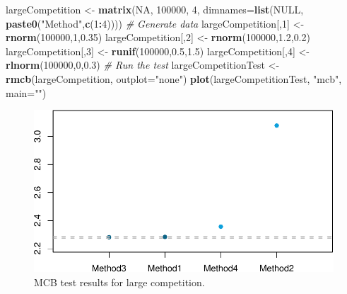 \documentclass[]{book}
\newenvironment{Shaded}{\begin{snugshade}}{\end{snugshade}}
\newcommand{\CommentTok}[1]{\textcolor[rgb]{0.56,0.35,0.01}{\textit{#1}}}
\newcommand{\DataTypeTok}[1]{\textcolor[rgb]{0.13,0.29,0.53}{#1}}
\newcommand{\DecValTok}[1]{\textcolor[rgb]{0.00,0.00,0.81}{#1}}
\newcommand{\FloatTok}[1]{\textcolor[rgb]{0.00,0.00,0.81}{#1}}
\newcommand{\KeywordTok}[1]{\textcolor[rgb]{0.13,0.29,0.53}{\textbf{#1}}}
\newcommand{\NormalTok}[1]{#1}
\newcommand{\OperatorTok}[1]{\textcolor[rgb]{0.81,0.36,0.00}{\textbf{#1}}}
\newcommand{\OtherTok}[1]{\textcolor[rgb]{0.56,0.35,0.01}{#1}}
\newcommand{\StringTok}[1]{\textcolor[rgb]{0.31,0.60,0.02}{#1}}
\theoremstyle{definition}
\theoremstyle{definition}
\theoremstyle{definition}
\theoremstyle{definition}
\theoremstyle{remark}
\begin{document}
\begin{Shaded}
\begin{Highlighting}[]
\NormalTok{largeCompetition <-}\StringTok{ }
\StringTok{  }\KeywordTok{matrix}\NormalTok{(}\OtherTok{NA}\NormalTok{, }\DecValTok{100000}\NormalTok{, }\DecValTok{4}\NormalTok{,}
         \DataTypeTok{dimnames=}\KeywordTok{list}\NormalTok{(}\OtherTok{NULL}\NormalTok{, }\KeywordTok{paste0}\NormalTok{(}\StringTok{"Method"}\NormalTok{,}\KeywordTok{c}\NormalTok{(}\DecValTok{1}\OperatorTok{:}\DecValTok{4}\NormalTok{))))}
\CommentTok{# Generate data}
\NormalTok{largeCompetition[,}\DecValTok{1}\NormalTok{] <-}\StringTok{ }\KeywordTok{rnorm}\NormalTok{(}\DecValTok{100000}\NormalTok{,}\DecValTok{1}\NormalTok{,}\FloatTok{0.35}\NormalTok{)}
\NormalTok{largeCompetition[,}\DecValTok{2}\NormalTok{] <-}\StringTok{ }\KeywordTok{rnorm}\NormalTok{(}\DecValTok{100000}\NormalTok{,}\FloatTok{1.2}\NormalTok{,}\FloatTok{0.2}\NormalTok{)}
\NormalTok{largeCompetition[,}\DecValTok{3}\NormalTok{] <-}\StringTok{ }\KeywordTok{runif}\NormalTok{(}\DecValTok{100000}\NormalTok{,}\FloatTok{0.5}\NormalTok{,}\FloatTok{1.5}\NormalTok{)}
\NormalTok{largeCompetition[,}\DecValTok{4}\NormalTok{] <-}\StringTok{ }\KeywordTok{rlnorm}\NormalTok{(}\DecValTok{100000}\NormalTok{,}\DecValTok{0}\NormalTok{,}\FloatTok{0.3}\NormalTok{)}
\CommentTok{# Run the test}
\NormalTok{largeCompetitionTest <-}\StringTok{ }\KeywordTok{rmcb}\NormalTok{(largeCompetition, }\DataTypeTok{outplot=}\StringTok{"none"}\NormalTok{)}
\KeywordTok{plot}\NormalTok{(largeCompetitionTest, }\StringTok{"mcb"}\NormalTok{, }\DataTypeTok{main=}\StringTok{""}\NormalTok{)}
\end{Highlighting}
\end{Shaded}

\begin{figure}
\centering
\includegraphics{Svetunkov--2022----ADAM_files/figure-latex/mcbForCompetitionLarge-1.pdf}
\caption{\label{fig:mcbForCompetitionLarge}MCB test results for large competition.}
\end{figure}
\end{document}
